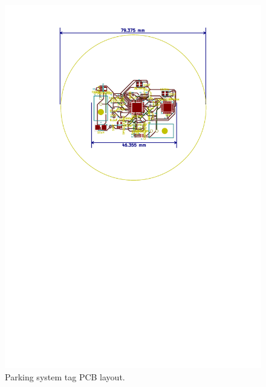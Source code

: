\begin{figure}[H]
\begin{center}
\includegraphics[scale=0.6,trim={4cm 15cm 4cm 1cm},clip]{data/pcb-layout.pdf}
\caption{Parking system tag PCB layout.}
\end{center}
\end{figure}

